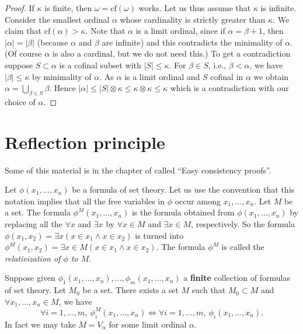 \begin{proof}
If $\kappa$ is finite, then $\omega = \text{cf}(\omega)$ works.
Let us thus assume that $\kappa$ is infinite.
Consider the smallest ordinal $\alpha$ whose cardinality is strictly greater
than $\kappa$. We claim that $\text{cf}(\alpha) > \kappa$.
Note that $\alpha$ is a limit ordinal, since if $\alpha = \beta + 1$, then
$|\alpha| = |\beta|$ (because $\alpha$ and $\beta$ are infinite) and
this contradicts the minimality of $\alpha$. (Of course $\alpha$ is also
a cardinal, but we do not need this.) To get a contradiction
suppose $S \subset \alpha$ is a cofinal
subset with $|S| \leq \kappa$. For $\beta \in S$, i.e., $\beta < \alpha$,
we have $|\beta| \leq \kappa$ by minimality of $\alpha$. As $\alpha$ is
a limit ordinal and $S$ cofinal in $\alpha$ we obtain
$\alpha = \bigcup_{\beta \in S} \beta$. Hence
$|\alpha| \leq |S| \otimes \kappa \leq \kappa \otimes \kappa \leq \kappa$
which is a contradiction with our choice of $\alpha$.
\end{proof}



\section{Reflection principle}
\label{section-reflection-principle}

\noindent
Some of this material is in the chapter of \cite{Kunen} called
``Easy consistency proofs''.

\medskip\noindent
Let $\phi(x_1, \ldots, x_n)$ be a formula of set theory.
Let us use the convention that this notation implies that
all the free variables in $\phi$ occur among $x_1, \ldots, x_n$.
Let $M$ be a set.
The formula $\phi^M(x_1, \ldots, x_n)$ is the
formula obtained from $\phi(x_1, \ldots, x_n)$ by replacing all the
$\forall x$ and $\exists x$ by $\forall x\in M$ and $\exists x\in M$,
respectively. So the formula
$\phi(x_1, x_2) = \exists x (x\in x_1 \wedge x\in x_2)$
is turned  into
$\phi^M(x_1, x_2) = \exists x \in M (x\in x_1 \wedge x\in x_2)$.
The formula $\phi^M$ is called the {\it relativization of $\phi$
to $M$}.

\begin{theorem}
\label{theorem-reflection-principle}
Suppose given $\phi_1(x_1, \ldots, x_n), \ldots, \phi_m(x_1, \ldots, x_n)$
a {\bf finite} collection of
formulas of set theory. Let $M_0$ be a set.
There exists a set $M$ such that
$M_0 \subset M$ and
$\forall x_1, \ldots, x_n \in M$, we have
$$
\forall i = 1, \ldots, m, \ \phi_i^{M}(x_1, \ldots, x_n)
\Leftrightarrow
\forall i = 1, \ldots, m, \ \phi_i(x_1, \ldots, x_n).
$$
In fact we may take $M = V_\alpha$ for some limit ordinal $\alpha$.
\end{theorem}

